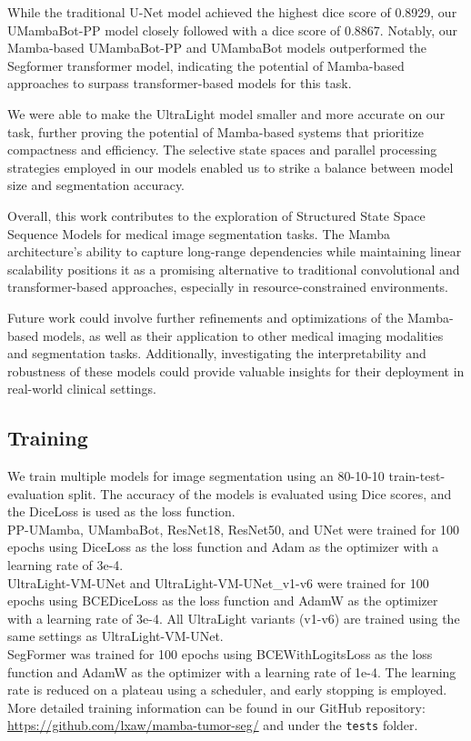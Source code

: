 \documentclass[conference]{IEEEtran}
\begin{document}
While the traditional U-Net model achieved the highest dice score of 0.8929, our UMambaBot-PP model closely followed with a dice score of 0.8867. Notably, our Mamba-based UMambaBot-PP and UMambaBot models outperformed the Segformer transformer model, indicating the potential of Mamba-based approaches to surpass transformer-based models for this task.

We were able to make the UltraLight model smaller and more accurate on our task, further proving the potential of Mamba-based systems that prioritize compactness and efficiency. The selective state spaces and parallel processing strategies employed in our models enabled us to strike a balance between model size and segmentation accuracy.

Overall, this work contributes to the exploration of Structured State Space Sequence Models for medical image segmentation tasks. The Mamba architecture's ability to capture long-range dependencies while maintaining linear scalability positions it as a promising alternative to traditional convolutional and transformer-based approaches, especially in resource-constrained environments.

Future work could involve further refinements and optimizations of the Mamba-based models, as well as their application to other medical imaging modalities and segmentation tasks. Additionally, investigating the interpretability and robustness of these models could provide valuable insights for their deployment in real-world clinical settings.








\appendix
\renewcommand{\thesection}{\Alph{section}}

\subsection{Training}
We train multiple models for image segmentation using an 80-10-10 train-test-evaluation split. The accuracy of the models is evaluated using Dice scores, and the DiceLoss is used as the loss function.  \\
PP-UMamba, UMambaBot, ResNet18, ResNet50, and UNet were trained for 100 epochs using DiceLoss as the loss function and Adam as the optimizer with a learning rate of 3e-4.\\
UltraLight-VM-UNet and UltraLight-VM-UNet\_v1-v6 were trained for 100 epochs using BCEDiceLoss as the loss function and AdamW as the optimizer with a learning rate of 3e-4. All UltraLight variants (v1-v6) are trained using the same settings as UltraLight-VM-UNet. \\
SegFormer was trained for 100 epochs using BCEWithLogitsLoss as the loss function and AdamW as the optimizer with a learning rate of 1e-4. The learning rate is reduced on a plateau using a scheduler, and early stopping is employed. \\
More detailed training information can be found in our GitHub repository: \url{https://github.com/lxaw/mamba-tumor-seg/} and under the \texttt{tests} folder.
\end{document}
